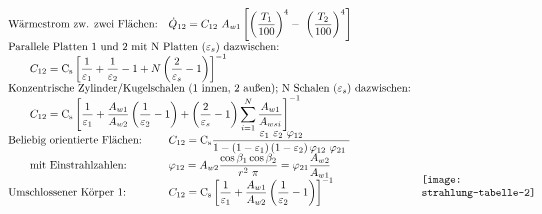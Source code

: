 \[\begin{array}{llc}
		\text{Wärmestrom zw. zwei Flächen:}               & \dot{Q}_{12} = C_{12}\ A_{w1}\left[\left(\dfrac{T_1}{100}\right)^4 -\ \left( \dfrac{T_2}{100} \right) ^4\right]                                                                                     &                                                                               \\
		\multicolumn{2}{l}{ \text{Parallele Platten 1 und 2 mit N Platten ($\varepsilon_s$) dazwischen:}}                                                                                                                                                       &                                                                               \\
		\multicolumn{2}{l}{ \qquad C_{12} = \Cs\left[\dfrac{1}{\varepsilon_1} + \dfrac{1}{\varepsilon_2} -1 + N \left(\dfrac{2}{\varepsilon_s} - 1\right)\right] ^{-1}}                                                                                         &                                                                               \\
		\multicolumn{2}{l}{	\text{Konzentrische Zylinder/Kugelschalen (1 innen, 2 außen); N Schalen ($ \varepsilon_s $) dazwischen:}}                                                                                                                           &                                                                               \\
		\multicolumn{2}{l}{	\qquad C_{12} = \Cs\left[ \dfrac{1}{\varepsilon_1} + \dfrac{A_{w1}}{A_{w2}} \left(\dfrac{1}{\varepsilon_2} -1\right) + \left(\dfrac{2}{\varepsilon_s} - 1\right) \displaystyle\sum_{i=1}^{N} \dfrac{A_{w1}}{A_{wsi}} \right] ^{-1}}   & \multirow{12}{2.5cm}{\texttt{[image: strahlung-tabelle-2]}}     \\
		\text{Beliebig orientierte Flächen:}              & C_{12} = \Cs\dfrac{\varepsilon_1\ \varepsilon_2\ \varphi_{12}}{1-\left(1- \varepsilon_1\right)\left(1-\varepsilon_2\right) \varphi_{12}\ \varphi_{21}\ }                                            &    \\
		\text{\qquad mit Einstrahlzahlen:}                & \varphi_{12} = A_{w2} \dfrac{\cos{\beta_1}\cos{\beta_2}}{r^2\ \pi}   =  \varphi_{21} \dfrac{A_{w2}}{A_{w1}}                                                                                         &                                                                               \\
		\text{Umschlossener Körper 1:}                    & C_{12}  = \Cs \left[ \dfrac{1}{\varepsilon_1} +  \dfrac{A_{w1}}{A_{w2}} \left(\dfrac{1}{\varepsilon_2} - 1\right) \right]^{-1}                                                                      &                                                                               \\

\end{array}\]
